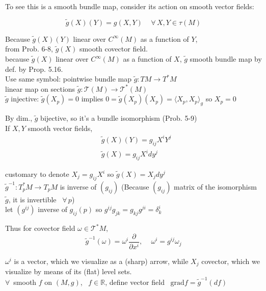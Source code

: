 To see this is a smooth bundle map, consider its action on smooth vector fields:

\[
\widetilde{g}(X)(Y) = g(X,Y) \quad \, \forall \, X,Y \in \tau(M)
\]

Because $\widetilde{g}(X)(Y)$ linear over $C^{\infty}(M)$ as a function of $Y$, \\
\quad from Prob. 6-8, $\widetilde{g}(X)$ smooth covector field. \\
\quad because $\widetilde{g}(X)$ linear over $C^{\infty}(M)$ as a function of $X$, $\widetilde{g}$ smooth bundle map by def. by Prop. 5.16. \\

Use same symbol: pointwise bundle map $\widetilde{g}:TM \to T^*M$ \\
\phantom{Use same symbol:} linear map on sections $\widetilde{g}: \mathcal{T}(M) \to \mathcal{T}^*(M)$  \\

$\widetilde{g}$ injective: $\widetilde{g}(X_p) = 0$ implies $0 = \widetilde{g}(X_p)(X_p) = \langle X_p, X_p \rangle_g$ so $X_p =0$

By dim., $\widetilde{g}$ bijective, so it's a bundle isomorphism (Prob. 5-9) \\

If $X,Y$ smooth vector fields, 
\[
\begin{aligned}
  & \widetilde{g}(X)(Y) = g_{ij} X^i Y^j \\ 
  &  \widetilde{g}(X) = g_{ij} X^i dy^j
\end{aligned}
\]

customary to denote $X_j = g_{ij} X^i$ so $\widetilde{g}(X) = X_j dy^j$ \\

$\widetilde{g}^{-1}:T_p^*M\to T_pM$ is inverse of $(g_{ij})$ (Because $(g_{ij})$ matrix of the isomorphism $\widetilde{g}$, it is invertible \, $\forall \, p$) \\
\quad let $(g^{ij})$ inverse of $g_{ij}(p)$ so $g^{ij}g_{jk} = g_{kj} g^{ji} = \delta^i_k$

Thus for covector field $\omega \in \mathcal{T}^*M$, 
\[
\widetilde{g}^{-1}(\omega) = \omega^i \frac{ \partial}{ \partial x^i},  \quad \, \omega^i = g^{ij} \omega_j 
\]

$\omega^i$ is a vector, which we visualize as a (sharp) arrow, while $X_j$ covector, which we visualize by means of its (flat) level sets.  \\

$\forall \, $ smooth $f$ on $(M,g)$, \, $f\in \mathbb{R}$, define vector field \quad \, $\text{grad}{f} =  \widetilde{g}^{-1}(df)$ \\


